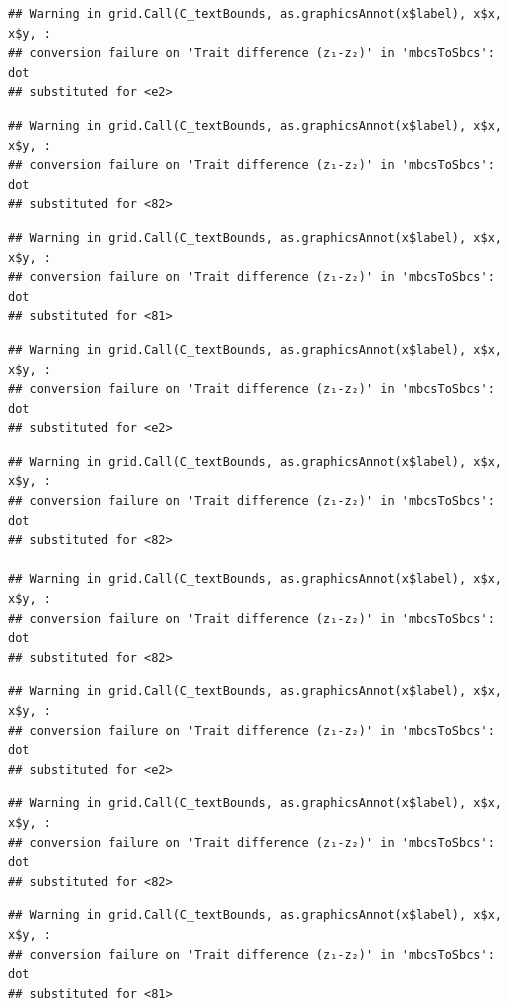 \documentclass[]{article}
\begin{document}
\begin{verbatim}
## Warning in grid.Call(C_textBounds, as.graphicsAnnot(x$label), x$x, x$y, :
## conversion failure on 'Trait difference (z₁-z₂)' in 'mbcsToSbcs': dot
## substituted for <e2>
\end{verbatim}

\begin{verbatim}
## Warning in grid.Call(C_textBounds, as.graphicsAnnot(x$label), x$x, x$y, :
## conversion failure on 'Trait difference (z₁-z₂)' in 'mbcsToSbcs': dot
## substituted for <82>
\end{verbatim}

\begin{verbatim}
## Warning in grid.Call(C_textBounds, as.graphicsAnnot(x$label), x$x, x$y, :
## conversion failure on 'Trait difference (z₁-z₂)' in 'mbcsToSbcs': dot
## substituted for <81>
\end{verbatim}

\begin{verbatim}
## Warning in grid.Call(C_textBounds, as.graphicsAnnot(x$label), x$x, x$y, :
## conversion failure on 'Trait difference (z₁-z₂)' in 'mbcsToSbcs': dot
## substituted for <e2>
\end{verbatim}

\begin{verbatim}
## Warning in grid.Call(C_textBounds, as.graphicsAnnot(x$label), x$x, x$y, :
## conversion failure on 'Trait difference (z₁-z₂)' in 'mbcsToSbcs': dot
## substituted for <82>

## Warning in grid.Call(C_textBounds, as.graphicsAnnot(x$label), x$x, x$y, :
## conversion failure on 'Trait difference (z₁-z₂)' in 'mbcsToSbcs': dot
## substituted for <82>
\end{verbatim}

\begin{verbatim}
## Warning in grid.Call(C_textBounds, as.graphicsAnnot(x$label), x$x, x$y, :
## conversion failure on 'Trait difference (z₁-z₂)' in 'mbcsToSbcs': dot
## substituted for <e2>
\end{verbatim}

\begin{verbatim}
## Warning in grid.Call(C_textBounds, as.graphicsAnnot(x$label), x$x, x$y, :
## conversion failure on 'Trait difference (z₁-z₂)' in 'mbcsToSbcs': dot
## substituted for <82>
\end{verbatim}

\begin{verbatim}
## Warning in grid.Call(C_textBounds, as.graphicsAnnot(x$label), x$x, x$y, :
## conversion failure on 'Trait difference (z₁-z₂)' in 'mbcsToSbcs': dot
## substituted for <81>
\end{verbatim}
\end{document}
